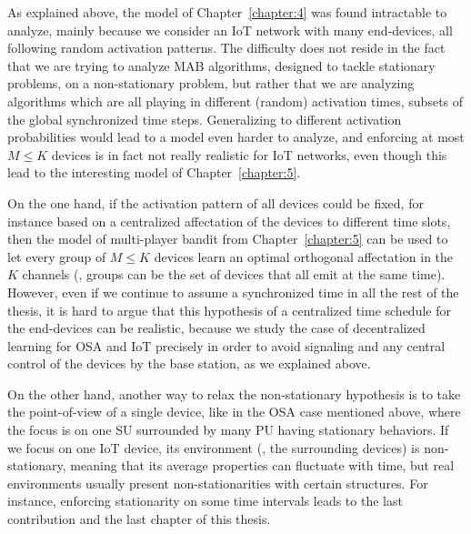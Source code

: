 As explained above, the model of Chapter~\ref{chapter:4} was found intractable to analyze, mainly because we consider an IoT network with many end-devices, all following random activation patterns.
The difficulty does not reside in the fact that we are trying to analyze MAB algorithms, designed to tackle stationary problems, on a non-stationary problem,
but rather that we are analyzing algorithms which are all playing in different (random) activation times, subsets of the global synchronized time steps.
Generalizing to different activation probabilities would lead to a model even harder to analyze, and enforcing at most $M \leq K$ devices is in fact not really realistic for IoT networks, even though this lead to the interesting model of Chapter~\ref{chapter:5}.

On the one hand, if the activation pattern of all devices could be fixed, for instance based on a centralized affectation of the devices to different time slots, then the model of multi-player bandit from Chapter~\ref{chapter:5} can be used to let every group of $M \leq K$ devices learn an optimal orthogonal affectation in the $K$ channels (\eg, groups can be the set of devices that all emit at the same time).
%
However, even if we continue to assume a synchronized time in all the rest of the thesis,
it is hard to argue that this hypothesis of a centralized time schedule for the end-devices can be realistic, because we study the case of decentralized learning for OSA and IoT precisely in order to avoid signaling and any central control of the devices by the base station, as we explained above.

On the other hand, another way to relax the non-stationary hypothesis is to take the point-of-view of a single device, like in the OSA case mentioned above, where the focus is on one SU surrounded by many PU having stationary behaviors.
If we focus on one IoT device, its environment (\ie, the surrounding devices) is non-stationary, meaning that its average properties can fluctuate with time, but real environments usually present non-stationarities with certain structures.
For instance, enforcing stationarity on some time intervals leads to the last contribution and the last chapter of this thesis.


